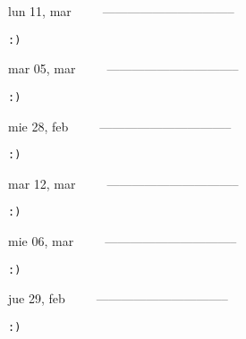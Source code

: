 \documentclass[letterpaper,10pt]{article}
\begin{document}
\begin{multicols}{3}
{lun 11, mar\ \ \ \ \ --------------------------------}
\begin{flushright}\begin{small}\texttt{:)}\end{small}\end{flushright}
\vfill
{mar 05, mar\ \ \ \ \ --------------------------------}
\begin{flushright}\begin{small}\texttt{:)}\end{small}\end{flushright}\par
\vfill
{mie 28, feb\ \ \ \ \ --------------------------------}
\begin{flushright}\begin{small}\texttt{:)}\end{small}\end{flushright}\par
\vfill
\end{multicols}
\vspace{1.05cm}

\begin{multicols}{3}
{mar 12, mar\ \ \ \ \ --------------------------------}
\begin{flushright}\begin{small}\texttt{:)}\end{small}\end{flushright}
\vfill
{mie 06, mar\ \ \ \ \ --------------------------------}
\begin{flushright}\begin{small}\texttt{:)}\end{small}\end{flushright}\par
\vfill
{jue 29, feb\ \ \ \ \ --------------------------------}
\begin{flushright}\begin{small}\texttt{:)}\end{small}\end{flushright}\par
\vfill
\end{multicols}
\vspace{1.05cm}
\end{document}
